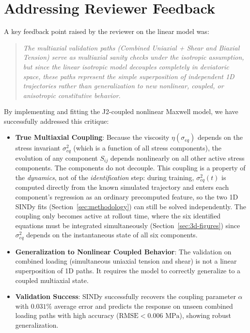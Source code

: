 \documentclass{article}
\begin{document}
\section{Addressing Reviewer Feedback}
A key feedback point raised by the reviewer on the linear model was:
\begin{quote}
    \textit{The multiaxial validation paths (Combined Uniaxial + Shear and Biaxial Tension) serve as multiaxial sanity checks under the isotropic assumption, but since the linear isotropic model decouples completely in deviatoric space, these paths represent the simple superposition of independent 1D trajectories rather than generalization to new nonlinear, coupled, or anisotropic constitutive behavior.}
\end{quote}

By implementing and fitting the J2-coupled nonlinear Maxwell model, we have successfully addressed this critique:
\begin{itemize}
    \item \textbf{True Multiaxial Coupling}: Because the viscosity $\eta(\sigma_{eq})$ depends on the stress invariant $\sigma_{eq}^2$ (which is a function of all stress components), the evolution of any component $S_{ij}$ depends nonlinearly on all other active stress components. The components do not decouple. This coupling is a property of the \emph{dynamics}, not of the \emph{identification} step: during training, $\sigma_{eq}^2(t)$ is computed directly from the known simulated trajectory and enters each component's regression as an ordinary precomputed feature, so the two 1D SINDy fits (Section~\ref{sec:methodology}) can still be solved independently. The coupling only becomes active at rollout time, where the six identified equations must be integrated simultaneously (Section~\ref{sec:3d-figures}) since $\sigma_{eq}^2$ depends on the instantaneous state of all six components.
    \item \textbf{Generalization to Nonlinear Coupled Behavior}: The validation on combined loading (simultaneous uniaxial tension and shear) is not a linear superposition of 1D paths. It requires the model to correctly generalize to a coupled multiaxial state. 
    \item \textbf{Validation Success}: SINDy successfully recovers the coupling parameter $\alpha$ with $0.031\%$ average error and predicts the response on unseen combined loading paths with high accuracy ($\text{RMSE} < 0.006\text{ MPa}$), showing robust generalization.
\end{itemize}
\end{document}
